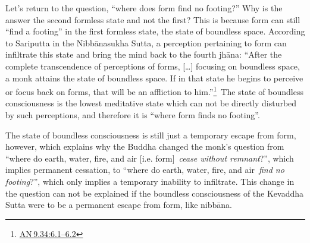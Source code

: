 \documentclass[10pt, openright]{book}
\begin{document}
Let's return to the question, “where does form find no footing?” Why is the answer the second formless state and not the first? This is because form can still “find a footing” in the first formless state, the state of boundless space. According to Sariputta in the Nibbānasukha Sutta, a perception pertaining to form can infiltrate this state and bring the mind back to the fourth jhāna: “After the complete transcendence of perceptions of forms, […] focusing on boundless space, a monk attains the state of boundless space. If in that state he begins to perceive or focus back on forms, that will be an affliction to him.”\footnote {\href{https://suttacentral.net/an9.34/en/sujato\#6.1}{AN 9.34:6.1–6.2}} The state of boundless consciousness is the lowest meditative state which can not be directly disturbed by such perceptions, and therefore it is “where form finds no footing”.


The state of boundless consciousness is still just a temporary escape from form, however, which explains why the Buddha changed the monk's question from “where do earth, water, fire, and air [i.e. form] \textit{cease without remnant}?”, which implies permanent cessation, to “where do earth, water, fire, and air \textit{find no footing}?”, which only implies a temporary inability to infiltrate. This change in the question can not be explained if the boundless consciousness of the Kevaddha Sutta were to be a permanent escape from form, like nibbāna.
\end{document}
